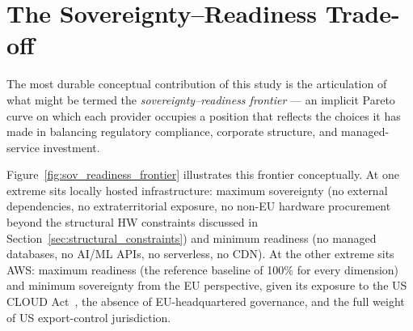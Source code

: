 \section{The Sovereignty--Readiness Trade-off}
\label{sec:sov_readiness_tradeoff}

The most durable conceptual contribution of this study is the articulation of what might be termed the \emph{sovereignty--readiness frontier} — an implicit Pareto curve on which each provider occupies a position that reflects the choices it has made in balancing regulatory compliance, corporate structure, and managed-service investment.

Figure~\ref{fig:sov_readiness_frontier} illustrates this frontier conceptually. At one extreme sits locally hosted infrastructure: maximum sovereignty (no external dependencies, no extraterritorial exposure, no non-EU hardware procurement beyond the structural HW constraints discussed in Section~\ref{sec:structural_constraints}) and minimum readiness (no managed databases, no AI/ML APIs, no serverless, no CDN). At the other extreme sits AWS: maximum readiness (the reference baseline of 100\% for every dimension) and minimum sovereignty from the EU perspective, given its exposure to the US CLOUD Act~\cite{SchremsII_2020}, the absence of EU-headquartered governance, and the full weight of US export-control jurisdiction.

